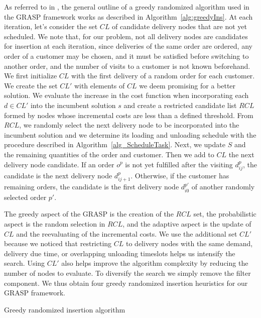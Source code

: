 \documentclass{article}
\begin{document}
{As referred to in \cite{resende2019greedy}, the general outline of a greedy randomized algorithm used in the GRASP framework works as described in Algorithm~\ref{alg:greedyIns}. At each iteration, let's consider the set $CL$ of candidate delivery nodes that are not yet scheduled. We note that, for our problem, not all delivery nodes are candidates for insertion at each iteration, since deliveries of the same order are ordered, any order of a customer may be chosen, and it must be satisfied before switching to another order, and the number of visits to a customer is not known beforehand. We first initialize $CL$ with the first delivery of a random order for each customer. We create the set $CL'$ with elements of $CL$ we deem promising for a better solution. We evaluate the increase in the cost function when incorporating each $d \in CL'$ into the incumbent solution $s$ and create a restricted candidate list $RCL$ formed by nodes whose incremental costs are less than a defined threshold. From $RCL$, we randomly select the next delivery node to be incorporated into the incumbent solution and we determine its loading and unloading schedule with the procedure described in Algorithm~\ref{alg_ScheduleTask}. Next, we update $S$ and the remaining quantities of the order and customer. Then we add to $CL$ the next delivery node candidate. If an order $o^p$ is not yet fulfilled after the visiting $d^p_{ij}$, the candidate is the next delivery node $d^p_{ij+1}$. Otherwise, if the customer has remaining orders, the candidate is the first delivery node $d^{p'}_{i0}$ of another randomly selected order $p'$.

The greedy aspect of the GRASP is the creation of the $RCL$ set, the probabilistic aspect is the random selection in $RCL$, and the adaptive aspect is the update of $CL$ and the reevaluating of the incremental costs. We use the additional set $CL'$ because we noticed that restricting $CL$ to delivery nodes with the same demand, delivery due time, or overlapping unloading timeslots helps us intensify the search. Using $CL'$ also helps improve the algorithm complexity by reducing the number of nodes to evaluate. To diversify the search we simply remove the filter component. We thus obtain four greedy randomized insertion heuristics for our GRASP framework.

 {
     \begin{algorithm}[hbt]         
         \caption{Greedy randomized insertion algorithm }
         \label{alg:greedyIns}
         \DontPrintSemicolon
         \LinesNumbered
         \setcounter{AlgoLine}{0}


\end{algorithm}}}
\end{document}
